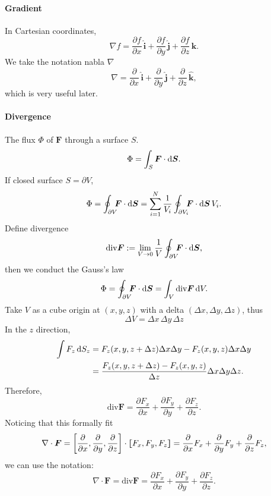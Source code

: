 \documentclass{article}
\def\d{{\rm d}}
\newcommand{\ko}[1]{\hspace{-#1 pt}}%
\newcommand{\pd}[2]{\frac{\partial #1}{\partial #2}}%
\newcommand{\cmm}[1]{\lfloor\ko{4.45}\lceil #1\rceil\ko{4.45}\rfloor}%
\newcommand{\ibm}[1]{\,\hat{\bm #1}}%
\begin{document}
\paragraph{Gradient} In Cartesian coordinates,
$$\nabla f=\pd fx\ibm i+\pd fy\ibm j+\pd fz\ibm k.$$
We take the notation nabla $\nabla$
$$\nabla=\pd{}x\ibm i+\pd{}y\ibm j+\pd{}z\ibm k,$$
which is very useful later.
\paragraph{Divergence} The flux $\Phi$ of $\bm F$ through a surface $S$.
$$\Phi=\int_S\bm F\cdot\d\bm S.$$
If closed surface $S=\partial V$,
$$\Phi=\oint_{\partial V}\ko5\bm F\cdot\d\bm S=\sum_{i=1}^N\frac1{V_i}\oint_{\partial V_i}\ko5\bm F\cdot\d\bm S\,V_i.$$
Define divergence
$$\text{div}\bm F:=\lim_{V\to0}\frac1V\oint_{\partial V}\ko5\bm F\cdot\d\bm S,$$
then we conduct the Gauss's law
$$\Phi=\oint_{\partial V}\ko5\bm F\cdot\d\bm S=\int_V\text{div}\bm F\,\d V.$$
Take $V$ as a cube origin at $(x,y,z)$ with a delta $(\Delta x,\Delta y,\Delta z)$, thus
$$\Delta V=\Delta x\,\Delta y\,\Delta z$$
In the $z$ direction,
\begin{align*}
	\int F_z\,\d S_z & = F_z(x,y,z+\Delta z)\Delta x\Delta y- F_z(x,y,z)\Delta x\Delta y           \\
	                 & =\frac{ F_z(x,y,z+\Delta z)- F_z(x,y,z)}{\Delta z}\Delta x\Delta y\Delta z.
\end{align*}
Therefore,
$$\text{div}\bm F=\pd{ F_x}x+\pd{ F_y}y+\pd{ F_z}z.$$
Noticing that this formally fit
$$\nabla\cdot\bm F=\left[\pd{}x,\pd{}y,\pd{}z\right]\cdot\cmm{F_x, F_y, F_z}=\pd{}x F_x+\pd{}y F_y+\pd{}z F_z,$$
we can use the notation:
$$\nabla\cdot\bm F=\text{div}\bm F=\pd{ F_x}x+\pd{ F_y}y+\pd{ F_z}z.$$
\end{document}

